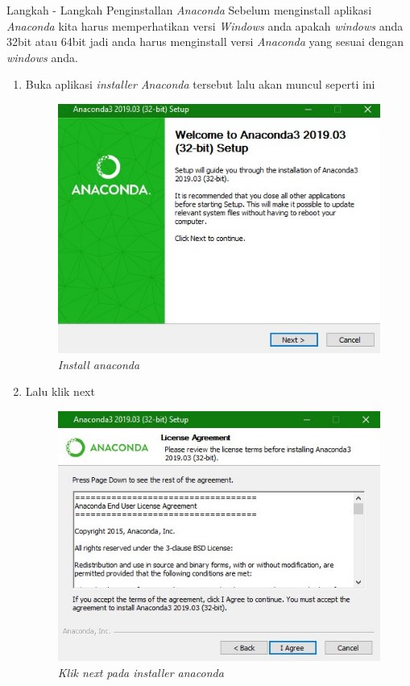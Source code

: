 \par\large Langkah - Langkah Penginstallan \textit{Anaconda}
Sebelum menginstall aplikasi \textit{Anaconda} kita harus memperhatikan versi \textit{Windows} anda apakah \textit{windows} anda 32bit atau 64bit jadi anda harus menginstall versi \textit{Anaconda} yang sesuai dengan \textit{windows} anda. 
\begin{enumerate}
\item Buka aplikasi \textit{installer Anaconda} tersebut lalu akan muncul seperti ini 

\begin{figure}[!htbp]
    \centering
    \includegraphics[scale=0.6]{gambar/1.jpg}
    \caption{\textit{Install anaconda}}
    \label{Figure1}
\end{figure}

 
\item Lalu klik next

\begin{figure}[!htbp]
    \centering
    \includegraphics[scale=0.6]{gambar/2.jpg}
    \caption{\textit{Klik next pada installer anaconda}}
    \label{Figure2}
\end{figure}




\end{enumerate}
